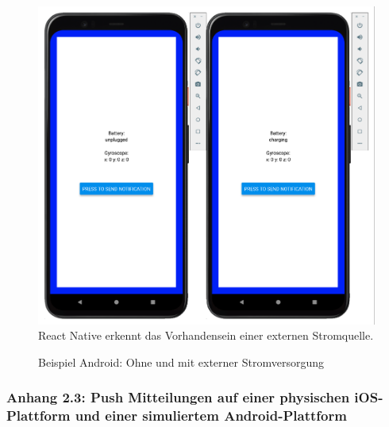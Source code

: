 \documentclass[a4paper]{scrartcl}
\begin{document}
\begin{figure}[H]
	\centering
	\caption{Beispiel Android: Ohne und mit externer Stromversorgung}
	\includegraphics[scale=0.3]{_assets/Android_unplugged_charging.png} \\
	React Native erkennt das Vorhandensein einer externen Stromquelle. 
\end{figure}

\newpage

\subsubsection*{Anhang 2.3: Push Mitteilungen auf einer physischen iOS-Plattform und einer simuliertem Android-Plattform}
\end{document}
